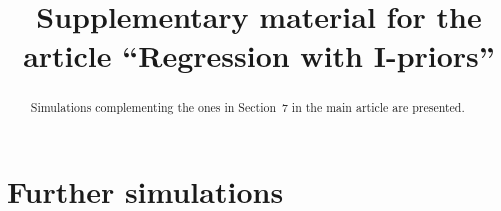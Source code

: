 \documentclass[preprint,12pt,authoryear]{elsarticle}
\begin{document}
	
	\begin{frontmatter}
		
		
		
		\title{Supplementary material for the article ``Regression with I-priors''}
		
		
		
		\begin{abstract}
Simulations complementing the ones in Section~7 in the main article are presented. 
		
		\end{abstract}

		
	\end{frontmatter}
	
	


\section{Further simulations}\label{app-sim}
\end{document}
